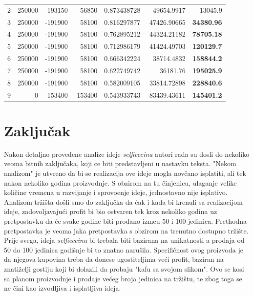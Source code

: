 \documentclass[12pt]{article}
\begin{document}
\begin{landscape}
\begin{table}[htbp]
\begin{tabular}{rrrrrrr}
    2     & 250000 & -193150 & 56850 & 0.873438728 & 49654.9917 & -13045.9 \\
    3     & 250000 & -191900 & 58100 & 0.816297877 & 47426.90665 & \textbf{34380.96} \\
    4     & 250000 & -191900 & 58100 & 0.762895212 & 44324.21182 & \textbf{78705.18} \\
    5     & 250000 & -191900 & 58100 & 0.712986179 & 41424.49703 & \textbf{120129.7} \\
    6     & 250000 & -191900 & 58100 & 0.666342224 & 38714.4832 & \textbf{158844.2} \\
    7     & 250000 & -191900 & 58100 & 0.622749742 & 36181.76 & \textbf{195025.9} \\
    8     & 250000 & -191900 & 58100 & 0.582009105 & 33814.72898 & \textbf{228840.6} \\
    \midrule
    9     & 0     & -153400 & -153400 & 0.543933743 & -83439.43611 & \textbf{145401.2} \\
    \bottomrule
    \end{tabular}%
  \label{profit3}%
\end{table}%

\end{landscape}

\section{Zaključak}
Nakon detaljno provedene analize ideje \textit{selfieccina} autori rada su dosli do nekoliko veoma bitnih zaklju\v{c}aka, koji ce biti predstavljeni u nastavku teksta. "Nekom analizom" je utvr\dj eno da bi se realizacija ove ideje mogla nov\v{c}ano isplatiti, ali tek nakon nekoliko godina proizvodnje. S obzirom na tu \v{c}injenicu, ulaganje velike koli\v{c}ine vremena u razvijanje i sprovo\dj enje ideje, jednostavno nije isplativo. Analizom tr\v{z}i\v{s}ta do\v{s}li smo do zaklju\v{c}ka da \v{c}ak i kada bi krenuli sa realizacijom ideje, zadovoljavaju\'ci profit bi bio ostvaren tek kroz nekoliko godina uz pretpostavku da \'ce svake godine biti prodano izme\dj u 50 i 100 jedinica. Prethodna pretpostavka je veoma jaka pretpostavka s obzirom na trenutno dostupno tr\v{z}i\v{s}te. Prije svega, ideja \textit{selfieccina} bi trebala biti bazirana na unikatnosti a prodaja od 50 do 100 jedinica godi\v{s}nje bi to znatno naru\v{s}ila. Specifi\v{c}nost ovog proizvoda je da njegova kupovina treba da donese ugostiteljima ve\'ci profit, baziran na znati\v{z}elji gostiju koji bi dolazili da probaju "kafu sa svojom slikom". Ovo se kosi sa planom proizvodnje i prodaje ve\'ceg broja jedinica na tr\v{z}i\v{s}tu, te zbog toga se ne \v{c}ini kao izvodljiva i isplatljiva ideja.


\end{document}
